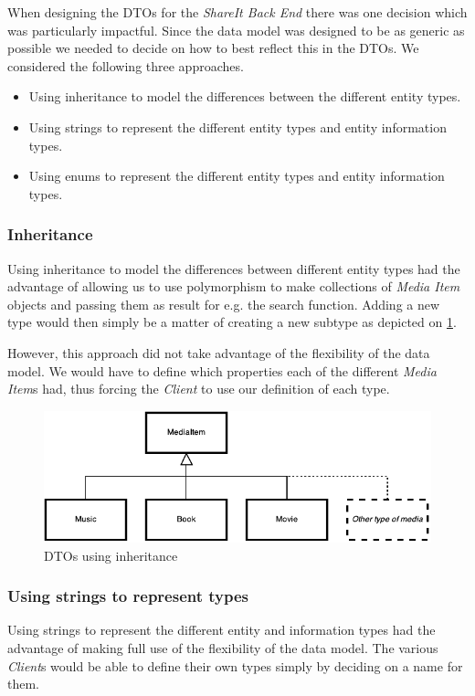 \documentclass[../report.tex]{subfiles}
\begin{document}
\graphicspath{{img/}{../img/}}
\label{sec:enums}

When designing the DTOs for the \textit{ShareIt Back End} there was one decision which was particularly impactful. Since the data model was designed to be as generic as possible we needed to decide on how to best reflect this in the DTOs. We considered the following three approaches.
\begin{itemize}
\item Using inheritance to model the differences between the different entity types.
\item Using strings to represent the different entity types and entity information types.
\item Using enums to represent the different entity types and entity information types.
\end{itemize}

\subsubsection{Inheritance}
Using inheritance to model the differences between different entity types had the advantage of allowing us to use polymorphism to make collections of \textit{Media Item} objects and passing them as result for e.g. the search function. Adding a new type would then simply be a matter of creating a new subtype as depicted on \ref{fig:dto_inheritance}.
 
However, this approach did not take advantage of the flexibility of the data model. We would have to define which properties each of the different \textit{Media Item}s had, thus forcing the \textit{Client} to use our definition of each type.

\begin{figure}[!h]
\label{fig:dto_inheritance}
\centering
\includegraphics[scale=0.7]{DTOInheritance.pdf}
\caption{DTOs using inheritance}
\end{figure}

\subsubsection{Using strings to represent types}
Using strings to represent the different entity and information types had the advantage of making full use of the flexibility of the data model. The various \textit{Client}s would be able to define their own types simply by deciding on a name for them. 
\end{document}
